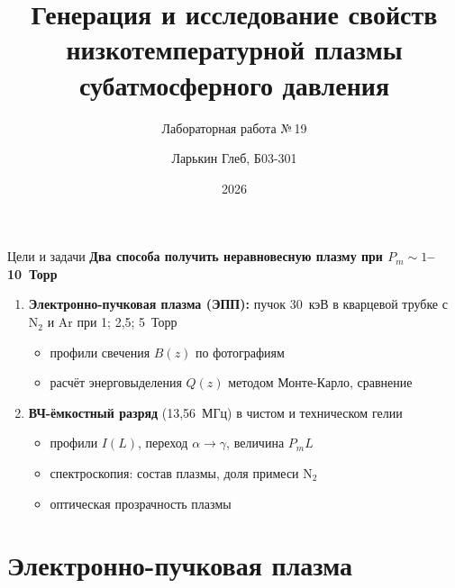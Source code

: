 \documentclass[aspectratio=169,10pt]{beamer}
\title[Низкотемпературная плазма]{Генерация и исследование свойств\\
  низкотемпературной плазмы субатмосферного давления}
\subtitle{Лабораторная работа №\,19}
\author[Ларькин Г.]{Ларькин Глеб, Б03-301}
\institute[МФТИ]{МФТИ, Физтех-школа аэрокосмических технологий}
\date{2026}
\newcommand{\Nt}{\mathrm{N_2}}
\begin{document}
\begin{frame}
  \titlepage
\end{frame}

\begin{frame}{Цели и задачи}
  \textbf{Два способа получить неравновесную плазму при $P_m \sim 1$--10~Торр}
  \begin{enumerate}
    \item \textbf{Электронно-пучковая плазма (ЭПП):} пучок 30~кэВ в
          кварцевой трубке с $\Nt$ и Ar при 1; 2,5; 5~Торр
          \begin{itemize}
            \item профили свечения $B(z)$ по фотографиям
            \item расчёт энерговыделения $Q(z)$ методом Монте-Карло, сравнение
          \end{itemize}
    \item \textbf{ВЧ-ёмкостный разряд} (13,56~МГц) в чистом и техническом гелии
          \begin{itemize}
            \item профили $I(L)$, переход $\alpha\to\gamma$, величина $P_m L$
            \item спектроскопия: состав плазмы, доля примеси $\Nt$
            \item оптическая прозрачность плазмы
          \end{itemize}
  \end{enumerate}
\end{frame}

\section{Электронно-пучковая плазма}
\end{document}
